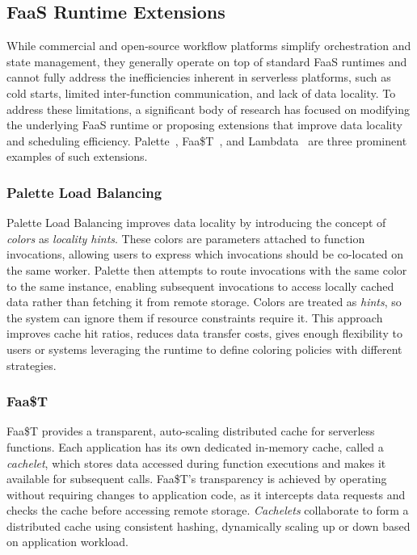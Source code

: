 \documentclass[conference]{IEEEtran}
\begin{document}
\subsection{FaaS Runtime Extensions}
While commercial and open-source workflow platforms simplify orchestration and state management, they generally operate on top of standard FaaS runtimes and cannot fully address the inefficiencies inherent in serverless platforms, such as cold starts, limited inter-function communication, and lack of data locality. To address these limitations, a significant body of research has focused on modifying the underlying FaaS runtime or proposing extensions that improve data locality and scheduling efficiency. Palette~\cite{palette_load_balancing}, Faa\$T~\cite{faast_caching}, and Lambdata~\cite{lambdata_intents} are three prominent examples of such extensions.

\subsubsection{Palette Load Balancing}
Palette Load Balancing improves data locality by introducing the concept of \textit{colors} as \textit{locality hints}. These colors are parameters attached to function invocations, allowing users to express which invocations should be co-located on the same worker. Palette then attempts to route invocations with the same color to the same instance, enabling subsequent invocations to access locally cached data rather than fetching it from remote storage. Colors are treated as \textit{hints}, so the system can ignore them if resource constraints require it. This approach improves cache hit ratios, reduces data transfer costs, gives enough flexibility to users or systems leveraging the runtime to define coloring policies with different strategies.

\subsubsection{Faa\$T}
Faa\$T provides a transparent, auto-scaling distributed cache for serverless functions. Each application has its own dedicated in-memory cache, called a \textit{cachelet}, which stores data accessed during function executions and makes it available for subsequent calls. Faa\$T's transparency is achieved by operating without requiring changes to application code, as it intercepts data requests and checks the cache before accessing remote storage. \textit{Cachelets} collaborate to form a distributed cache using consistent hashing, dynamically scaling up or down based on application workload.
\end{document}
